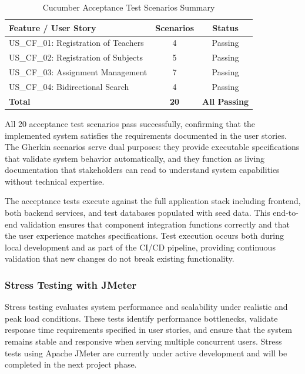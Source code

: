 \documentclass[12pt,a4paper]{article}
\begin{document}
\begin{table}[htbp]
	\centering
	\caption{Cucumber Acceptance Test Scenarios Summary}
	\label{tab:cucumber_scenarios}
	\begin{tabular}{@{}lcc@{}}
		\toprule
		\textbf{Feature / User Story} & \textbf{Scenarios} & \textbf{Status} \\ 
		\midrule
		US\_CF\_01: Registration of Teachers & 4 & Passing \\
		US\_CF\_02: Registration of Subjects & 5 & Passing \\
		US\_CF\_03: Assignment Management & 7 & Passing \\
		US\_CF\_04: Bidirectional Search & 4 & Passing \\
		\midrule
		\textbf{Total} & \textbf{20} & \textbf{All Passing} \\
		\bottomrule
	\end{tabular}
\end{table}

All 20 acceptance test scenarios pass successfully, confirming that the implemented system satisfies the requirements documented in the user stories. The Gherkin scenarios serve dual purposes: they provide executable specifications that validate system behavior automatically, and they function as living documentation that stakeholders can read to understand system capabilities without technical expertise.\newline

The acceptance tests execute against the full application stack including frontend, both backend services, and test databases populated with seed data. This end-to-end validation ensures that component integration functions correctly and that the user experience matches specifications. Test execution occurs both during local development and as part of the CI/CD pipeline, providing continuous validation that new changes do not break existing functionality.

\subsubsection{Stress Testing with JMeter}

Stress testing evaluates system performance and scalability under realistic and peak load conditions. These tests identify performance bottlenecks, validate response time requirements specified in user stories, and ensure that the system remains stable and responsive when serving multiple concurrent users. Stress tests using Apache JMeter are currently under active development and will be completed in the next project phase.\newline
\end{document}
